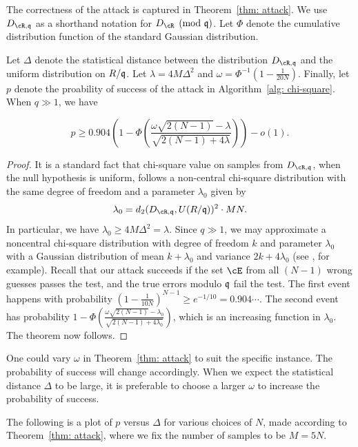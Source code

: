 \documentclass{amsart}
\begin{document}
The correctness of the attack is captured in Theorem~\ref{thm: attack}. We use $D_{\cR,\fq}$ as a shorthand notation for $D_{\cR} \pmod{\fq}$.  Let $\Phi$ denote the cumulative distribution function of the standard Gaussian distribution.

\begin{theorem} \label{thm: attack}
Let $\Delta$ denote the statistical distance between the distribution $D_{\cR, \fq}$ and the uniform distribution on $R/\mathfrak{q}$. Let $\lambda = 4 M \Delta^2$ and $\omega = \Phi^{-1}(1- \frac{1}{20N})$. Finally, let $p$ denote the proability of success of the attack in Algorithm~\ref{alg: chi-square}. When $q \gg 1$, we have

$$p  \geq 0.904 \left(1- \Phi \left(\frac{\omega \sqrt{2(N-1)}- \lambda}{\sqrt{2(N-1) +4\lambda}}\right) \right) - o(1).$$
\end{theorem}

\begin{proof}
It is a standard fact that chi-square value on samples from $D_{\cR, \fq}$, when the null hypothesis is uniform, follows a non-central chi-square distribution with the same degree of freedom and a parameter $\lambda_0$ given by
\[
    \lambda_0 =  d_2(D_{\cR, \fq}, U(R/\fq))^2 \cdot MN.
\]
In particular, we have $\lambda_0 \geq  4M\Delta^2 = \lambda$. Since $q \gg 1$, we may approximate a noncentral chi-square distribution with degree of freedom $k$ and parameter $\lambda_0$ with a Gaussian distribution of mean $k + \lambda_0$ and variance $2k + 4\lambda_0$ (see \cite{ryabko2004new}, for example). Recall that our attack succeeds if the set $\cE$ from all $(N-1)$ wrong guesses passes the test, and the true errors modulo $\mathfrak{q}$ fail the test. The first event happens with probability $(1 - \frac{1}{10N})^{N-1} \geq e^{-1/10} = 0.904 \cdots$. The second event has probability $1 - \Phi \left(\frac{\omega \sqrt{2(N-1)}- \lambda_0}{\sqrt{2(N-1) +4\lambda_0}}\right) $, which is an increasing function in $\lambda_0$. The theorem now follows.
\end{proof}

\begin{remark}
One could vary $\omega$ in Theorem~\ref{thm: attack} to suit the specific instance.
The probability of success will change accordingly. When we expect the statistical distance $\Delta$ to be large, it is preferable to choose a larger $\omega$ to increase the probability of success.
\end{remark}

The following is a plot of $p$ versus $\Delta$ for various choices of $N$, made according to Theorem~\ref{thm: attack}, where we fix the number of samples to be $M = 5N$.
\end{document}
